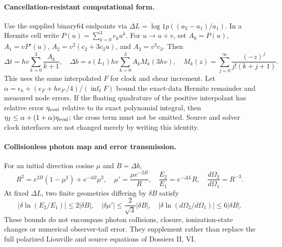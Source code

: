 \paragraph{Cancellation-resistant computational form.}
Use the supplied binary64 endpoints via
$\Delta L=\log1p((a_2-a_1)/a_1)$. In a Hermite cell write
$P(u)=\sum_{k=0}^3c_ku^k$. For $u\to u+v$, set
$A_0=P(u)$, $A_1=vP'(u)$,
$A_2=v^2(c_2+3c_3u)$, and $A_3=v^3c_3$. Then
\begin{equation}\label{eq:rec-r9-computation}
\Delta t=hv\sum_{k=0}^3\frac{A_k}{k+1},\quad
\Delta b=s(L_1)hv\sum_{k=0}^3A_k M_k(3hv),\quad
M_k(z)=\sum_{j=0}^{\infty}\frac{(-z)^j}{j!(k+j+1)}.
\end{equation}
This uses the same interpolated $F$ for clock and shear increment.
Let $\alpha=\epsilon_h+(e_F+h e_{F'}/4)/(\inf_I F)$
bound the exact-data Hermite remainder and measured node errors. If the
floating quadrature of the positive interpolant has relative error
$\eta_{\rm eval}$ relative to its exact polynomial integral, then
$\eta_I\le\alpha+(1+\alpha)\eta_{\rm eval}$; the cross term
must not be omitted. Source and solver clock interfaces are not changed
merely by writing this identity.

\paragraph{Collisionless photon map and error transmission.}
For an initial direction cosine $\mu$ and $B=\Delta b$,
\begin{equation}\label{eq:rec-r9-null-map}
 R^2=e^{2B}(1-\mu^2)+e^{-4B}\mu^2,
\quad \mu'=\frac{\mu e^{-2B}}R,\quad
 \frac{E_2}{E_1}=e^{-\Delta L}R,\quad
 \frac{d\Omega_2}{d\Omega_1}=R^{-3}.
\end{equation}
At fixed $\Delta L$, two finite geometries differing by $\delta B$ satisfy
\begin{equation}\label{eq:rec-r9-null-errors}
 |\delta\ln(E_2/E_1)|\le2|\delta B|,\quad
 |\delta\mu'|\le\frac2{\sqrt3}|\delta B|,\quad
 |\delta\ln(d\Omega_2/d\Omega_1)|\le6|\delta B|.
\end{equation}
These bounds do not encompass photon collisions, closure, ionization-state
changes or numerical observer-tail error. They supplement rather than
replace the full polarized Liouville and source equations of Dossiers II, VI.

